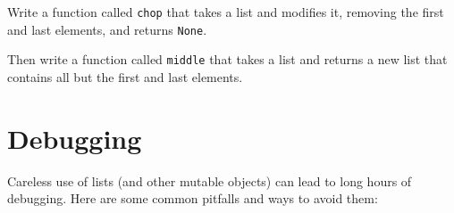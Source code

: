 \begin{ex}

Write a function called {\tt chop} that takes a list and modifies
it, removing the first and last elements, and returns {\tt None}.

Then write a function called {\tt middle} that takes a list and
returns a new list that contains all but the first and last
elements.

\end{ex}


\section{Debugging}

Careless use of lists (and other mutable objects)
can lead to long hours of debugging.  Here are some common
pitfalls and ways to avoid them:

